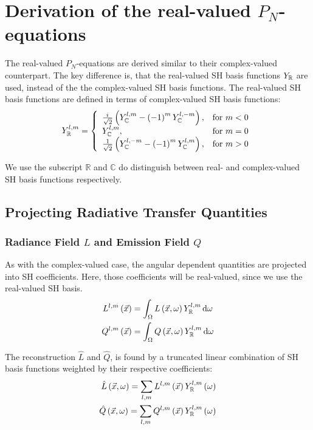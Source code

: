 \documentclass[10pt]{scrartcl}
\begin{document}
\section{Derivation of the real-valued $P_N$-equations}

The real-valued $P_N$-equations are derived similar to their complex-valued counterpart. The key difference is, that the real-valued SH basis functions $Y_{\mathbb{R}}$ are used, instead of the the complex-valued SH basis functions. The real-valued SH basis functions are defined in terms of complex-valued SH basis functions:
\begin{align}
\label{eq:real_sh_basis}
Y_{\mathbb{R}}^{l,m}=
\left\{
\begin{array}{lr}
\frac{{i\mkern1mu}}{\sqrt{2}}\left(Y_{\mathbb{C}}^{l,m}-\left(-1\right)^mY_{\mathbb{C}}^{l,-m}\right), & \text{for } m < 0\\
Y_{\mathbb{C}}^{l,m}, & \text{for } m = 0\\
\frac{1}{\sqrt{2}}\left(Y_{\mathbb{C}}^{l,-m}-\left(-1\right)^mY_{\mathbb{C}}^{l,m}\right), & \text{for } m > 0
\end{array}
\right.
\end{align}

We use the subscript $\mathbb{R}$ and $\mathbb{C}$ do distinguish between real- and complex-valued SH basis functions respectively.

\subsection{Projecting Radiative Transfer Quantities}

\subsubsection{Radiance Field $L$ and Emission Field $Q$}

As with the complex-valued case, the angular dependent quantities are projected into SH coefficients. Here, those coefficients will be real-valued, since we use the real-valued SH basis.
\begin{align}
L^{l,m}\left(\vec{x}\right)
&=
\int_\Omega{L\left(\vec{x}, \omega\right)Y_{\mathbb{R}}^{l,m}\,\mathrm{d}\omega}\nonumber\\
Q^{l,m}\left(\vec{x}\right)
&=
\int_\Omega{Q\left(\vec{x}, \omega\right)Y_{\mathbb{R}}^{l,m}\,\mathrm{d}\omega}\nonumber
\end{align} 

The reconstruction $\hat{L}$ and $\hat{Q}$, is found by a truncated linear combination of SH basis functions weighted by their respective coefficients:
\begin{align}
\label{eq:real_sh_exp_L}
\hat{L}\left(\vec{x}, \omega\right) =
\sum_{l,m}
{
L^{l,m}\left(\vec{x}\right)Y_{\mathbb{R}}^{l,m}\left(\omega\right)
}\nonumber\\
\hat{Q}\left(\vec{x}, \omega\right) =
\sum_{l,m}
{
Q^{l,m}\left(\vec{x}\right)Y_{\mathbb{R}}^{l,m}\left(\omega\right)
}
\end{align}
\end{document}
